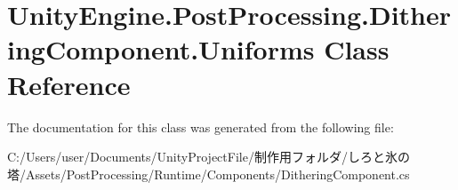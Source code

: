 \hypertarget{class_unity_engine_1_1_post_processing_1_1_dithering_component_1_1_uniforms}{}\section{Unity\+Engine.\+Post\+Processing.\+Dithering\+Component.\+Uniforms Class Reference}
\label{class_unity_engine_1_1_post_processing_1_1_dithering_component_1_1_uniforms}


The documentation for this class was generated from the following file\+:\begin{DoxyCompactItemize}
\item 
C\+:/\+Users/user/\+Documents/\+Unity\+Project\+File/制作用フォルダ/しろと氷の塔/\+Assets/\+Post\+Processing/\+Runtime/\+Components/Dithering\+Component.\+cs\end{DoxyCompactItemize}
